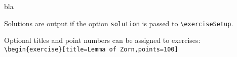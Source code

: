 \documentclass[german]{mhexsheet}
\begin{document}
\maketitle
\begin{exercise}
bla
\end{exercise}

\begin{solution}
Solutions are output if the option \verb|solution| is passed to \verb|\exerciseSetup|.
\end{solution}

\begin{exercise}[title=Lemma of Zorn,points=100]
Optional titles and point numbers can be assigned to exercises:\\
\verb!\begin{exercise}[title=Lemma of Zorn,points=100]!
\end{exercise}
\end{document}
